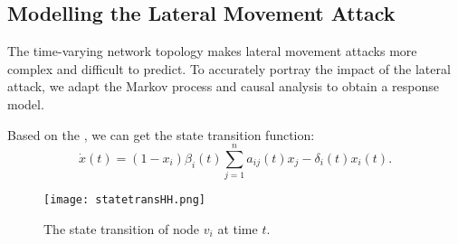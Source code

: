 \documentclass[lettersize,journal]{IEEEtran}
\begin{document}
\subsection{Modelling the Lateral Movement Attack}\label{lateral mov model}
The time-varying network topology makes lateral movement attacks more complex and difficult to predict. To accurately portray the impact of the lateral attack, we adapt the Markov process and causal analysis to obtain a response model.\par
Based on the \cite{zino2021analysis}, we can get the state transition function:
\begin{equation}
\label{eq_transe}
\Dot{x}(t)=(1-x_i)\beta_i(t)\sum_{j=1}^na_{ij}(t)x_j-\delta_i(t)x_i(t).
\end{equation}
\begin{figure}[!h]
\centering
\texttt{[image: statetransHH.png]}
\caption{The state transition of node $v_i$ at time $t$.}
\label{fig_2}
\end{figure}
\end{document}
